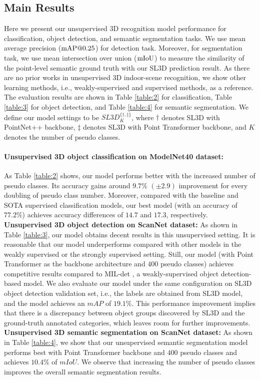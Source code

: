\documentclass{article}
\begin{document}
\setlength{\parskip}{0.0em}

\subsection{Main Results}

Here we present our unsupervised 3D recognition model performance for classification, object detection, and semantic segmentation tasks. We use mean average precision ($\hbox{mAP}@0.25$) for detection task. Moreover, for segmentation task, we use mean intersection over union ($\hbox{mIoU}$) to measure the similarity of the point-level semantic ground truth with our SL3D prediction result. 
As there are no prior works in unsupervised 3D indoor-scene recognition, we show other learning methods, i.e., weakly-supervised and supervised methods, as a reference. The evaluation results are shown in Table \ref{table:2} for classification, Table \ref{table:3} for object detection, and Table \ref{table:4} for semantic segmentation. We define our model settings to be $SL3D^{\{\dagger,\ddagger\}}_{K}$, where $\dagger$ denotes SL3D with PointNet++ backbone, $\ddagger$ denotes SL3D with Point Transformer backbone, and $K$ denotes the number of pseudo classes.
\setlength{\parskip}{0.0em}

\paragraph{Unsupervised 3D object classification on ModelNet40 dataset:}As Table \ref{table:2} shows, our model performs better with the increased number of pseudo classes. Its accuracy gains around $9.7\%$ $(\pm 2.9)$ improvement for every doubling of pseudo class number. Moreover, compared with the baseline and SOTA supervised classification models, our best model (with an accuracy of $77.2 \%$) achieves accuracy differences of $14.7$ and $17.3$, respectively.\textbf{ Unsupervised 3D object detection on ScanNet dataset: } As shown in Table \ref{table:3}, our model obtains decent results in this unsupervised setting. It is reasonable that our model underperforms compared with other models in the weakly supervised or the strongly supervised setting.
Still, our model (with Point Transformer as the backbone architecture and $400$ pseudo classes) achieves competitive results compared to MIL-det \cite{ren2021wypr}, a weakly-supervised object detection-based model. We also evaluate our model under the same configuration on SL3D object detection validation set, i.e., the labels are obtained from SL3D model, and the model achieves an \hbox{$mAP$} of $19.1\%$. 
This performance improvement implies that there is a discrepancy between object groups discovered by SL3D and the ground-truth annotated categories, which leaves room for further improvements. \textbf{ Unsupervised 3D semantic segmentation on ScanNet dataset: } As shown in Table \ref{table:4}, we show that our unsupervised semantic segmentation model performs best with Point Transformer backbone and $400$ pseudo classes and achieves $10.4\%$ of $mIoU$. We observe that increasing the number of pseudo classes improves the overall semantic segmentation results.
\end{document}
